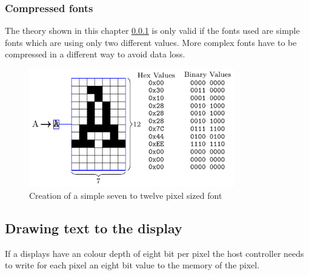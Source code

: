 \subsubsection{Compressed fonts}\label{chapter:CompressedFonts}

The theory shown in this chapter \ref{chapter:CompressedFonts} is only valid if the fonts used are simple fonts which are using only two different values. More complex fonts have to be compressed in a different way to avoid data loss. 
\begin{figure}[H]
	\centering
	\includegraphics[width=0.8\textwidth]{2-theory/drawing-graphics/graphics/font12.pdf}
	\caption{Creation of a simple seven to twelve pixel sized font\label{theory:font12}}
\end{figure}



\subsection{Drawing text to the display}

If a displays have an colour depth of eight bit per pixel the host controller needs to write for each pixel an eight bit value to the memory of the pixel. 

